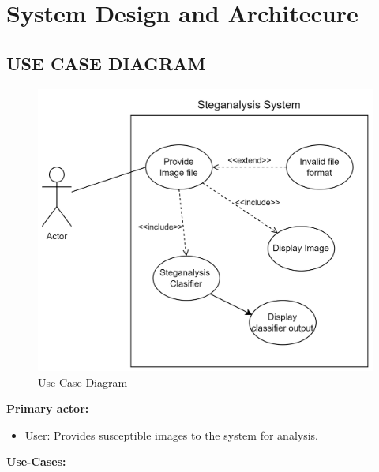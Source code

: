 \chapter{System Design and Architecure}
\section{USE CASE DIAGRAM}
\begin{figure}[H]
    \centering
    \includegraphics[width=120mm]{./img/useCase.png}
    \caption{Use Case Diagram}
\end{figure}
\large{\textbf{Primary actor:}}
\begin{itemize}[noitemsep]
    \item User: Provides susceptible images to the system for analysis.
\end{itemize}
\begin{flushleft}
\large{\textbf{Use-Cases:}}
\end{flushleft}
